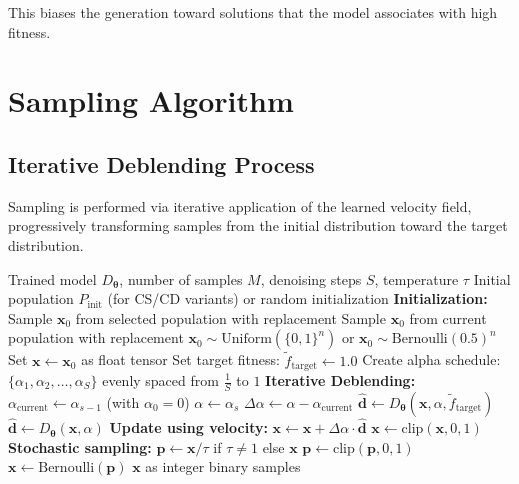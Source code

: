 \documentclass[11pt,a4paper]{article}
\newcommand{\vx}{\mathbf{x}}
\newcommand{\vtheta}{\boldsymbol{\theta}}
\begin{document}
This biases the generation toward solutions that the model associates with high fitness.

\section{Sampling Algorithm}

\subsection{Iterative Deblending Process}

Sampling is performed via iterative application of the learned velocity field, progressively transforming samples from the initial distribution toward the target distribution.

\begin{algorithm}[H]
\caption{Sampling from Binary DbD Model}
\label{alg:sampling}
\begin{algorithmic}[1]
\Require Trained model $D_\vtheta$, number of samples $M$, denoising steps $S$, temperature $\tau$
\Require Initial population $P_{\text{init}}$ (for CS/CD variants) or random initialization
\State \textbf{Initialization:}
    \State Sample $\vx_0$ from selected population with replacement
    \State Sample $\vx_0$ from current population with replacement
\Else
    \State $\vx_0 \sim \text{Uniform}(\{0,1\}^n)$ or $\vx_0 \sim \text{Bernoulli}(0.5)^n$
\EndIf
\State Set $\vx \gets \vx_0$ as float tensor
    \State Set target fitness: $\tilde{f}_{\text{target}} \gets 1.0$
\EndIf
\State Create alpha schedule: $\{\alpha_1, \alpha_2, \ldots, \alpha_S\}$ evenly spaced from $\frac{1}{S}$ to $1$
\State
\State \textbf{Iterative Deblending:}
    \State $\alpha_{\text{current}} \gets \alpha_{s-1}$ (with $\alpha_0 = 0$)
    \State $\alpha \gets \alpha_s$
    \State $\Delta\alpha \gets \alpha - \alpha_{\text{current}}$
    \State
        \State $\hat{\mathbf{d}} \gets D_\vtheta(\vx, \alpha, \tilde{f}_{\text{target}})$
    \Else
        \State $\hat{\mathbf{d}} \gets D_\vtheta(\vx, \alpha)$
    \EndIf
    \State
    \State \textbf{Update using velocity:}
    \State $\vx \gets \vx + \Delta\alpha \cdot \hat{\mathbf{d}}$
    \State $\vx \gets \text{clip}(\vx, 0, 1)$
    \State
    \State \textbf{Stochastic sampling:}
    \State $\mathbf{p} \gets \vx / \tau$ if $\tau \neq 1$ else $\vx$
    \State $\mathbf{p} \gets \text{clip}(\mathbf{p}, 0, 1)$
    \State $\vx \gets \text{Bernoulli}(\mathbf{p})$
\EndFor
\State \Return $\vx$ as integer binary samples
\end{algorithmic}
\end{algorithm}
\end{document}
